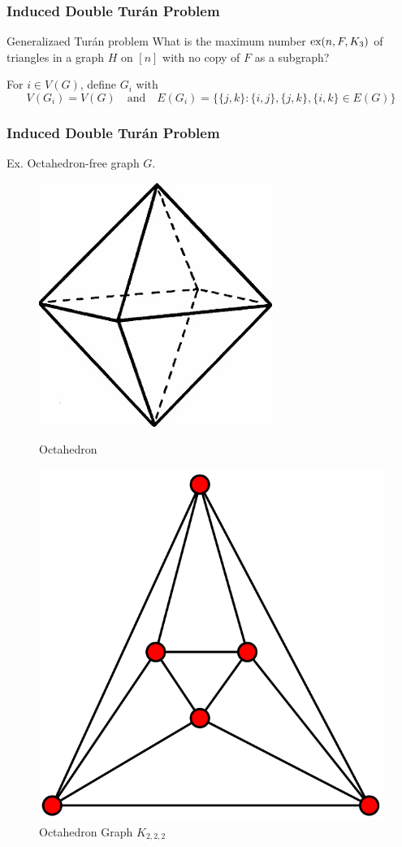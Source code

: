 \documentclass{beamer}
\newcommand*{\ex}{\textnormal{ex}}
\begin{document}
\begin{frame}
  \frametitle{Induced Double Turán Problem}

  \begin{block}{Generalizaed Turán problem}
    What is the maximum number $\ex(n, F, K_3)$ of triangles in a graph $H$ on $[n]$ with no copy of $F$ as a subgraph?
  \end{block}

  \pause 

  \vspace{0.5cm}

  For $i \in V(G)$, define $G_i$ with
  \[
    V(G_i) = V(G) \quad \text{and} \quad E(G_i) = \{\{j, k\} : \{i, j\}, \{j, k\}, \{i, k\} \in E(G)\}
  \]
\end{frame}

\begin{frame}
  \frametitle{Induced Double Turán Problem}

  Ex. Octahedron-free graph $G$.

  \begin{figure}
    \begin{minipage}{0.48\textwidth}
      \centering
      \includegraphics[width=0.45\linewidth]{oct}
      \caption{Octahedron}
    \end{minipage}
    \hfill
    \begin{minipage}{0.48\textwidth}
      \centering
      \includegraphics[width=0.45\linewidth]{Octahedron_graph}
      \caption{Octahedron Graph $K_{2,2,2}$}
    \end{minipage}
  \end{figure}


\end{frame}
\end{document}
